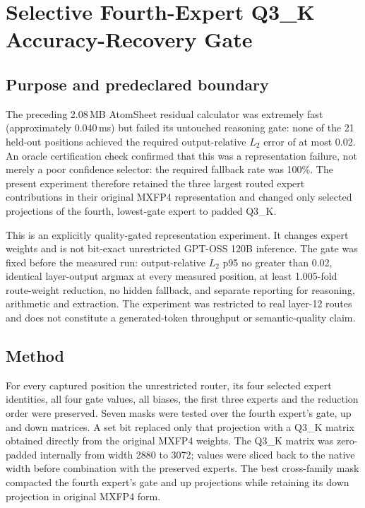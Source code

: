 \section{Selective Fourth-Expert Q3\_K Accuracy-Recovery Gate}
\label{sec:selective-fourth-expert-q3k}

\subsection{Purpose and predeclared boundary}

The preceding 2.08\,MB AtomSheet residual calculator was extremely fast
(approximately 0.040\,ms) but failed its untouched reasoning gate: none of the
21 held-out positions achieved the required output-relative $L_2$ error of at
most 0.02.  An oracle certification check confirmed that this was a
representation failure, not merely a poor confidence selector: the required
fallback rate was 100\%.  The present experiment therefore retained the three
largest routed expert contributions in their original MXFP4 representation and
changed only selected projections of the fourth, lowest-gate expert to padded
Q3\_K.

This is an explicitly quality-gated representation experiment.  It changes
expert weights and is not bit-exact unrestricted GPT-OSS 120B inference.  The
gate was fixed before the measured run: output-relative $L_2$ p95 no greater
than 0.02, identical layer-output argmax at every measured position, at least
1.005-fold route-weight reduction, no hidden fallback, and separate reporting
for reasoning, arithmetic and extraction.  The experiment was restricted to
real layer-12 routes and does not constitute a generated-token throughput or
semantic-quality claim.

\subsection{Method}

For every captured position the unrestricted router, its four selected expert
identities, all four gate values, all biases, the first three experts and the
reduction order were preserved.  Seven masks were tested over the fourth
expert's gate, up and down matrices.  A set bit replaced only that projection
with a Q3\_K matrix obtained directly from the original MXFP4 weights.  The
Q3\_K matrix was zero-padded internally from width 2880 to 3072; values were
sliced back to the native width before combination with the preserved experts.
The best cross-family mask compacted the fourth expert's gate and up
projections while retaining its down projection in original MXFP4 form.

